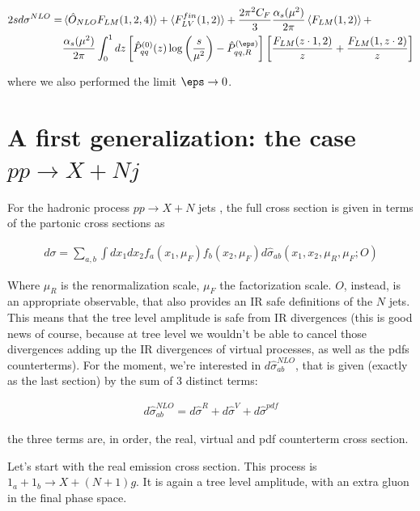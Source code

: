 \documentclass[11pt]{report}
\begin{document}
\begin{align}
    2sd\sigma^{NLO} = &\braket{\hat{O}_{NLO}F_{LM}(1, 2, 4)} + \braket{F_{LV}^{fin}(1, 2)} + \frac{2\pi^2C_F}{3}\frac{\alpha_s(\mu^2)}{2\pi}\braket{F_{LM}(1, 2)} + \notag \\ 
    & \frac{\alpha_s(\mu^2)}{2\pi}\int_0^1 dz \left[\hat{P}^{(0)}_{qq}(z)\log\left( \frac{s}{\mu^2} \right) - \hat{P}^{(\eps)}_{qq, R}\right] \left[\frac{F_{LM}(z\cdot1, 2)}{z} + \frac{F_{LM}(1, z\cdot 2)}{z}  \right]
\end{align}

where we also performed the limit \(\eps \to 0\). 

\section{A first generalization: the case \(pp \to X + Nj\)}

For the hadronic process \(pp \to X + N\) jets , the full cross section is given in terms of the partonic cross sections as 

\begin{align}
    \label{eq:qqXNgcrosssec}
    d\sigma = \sum_{a, b} \int dx_1 dx_2 f_a(x_1, \mu_F)f_b(x_2, \mu_F)d\hat{\sigma}_{ab}(x_1, x_2, \mu_R, \mu_F; O)
\end{align}

Where \(\mu_{R}\) is the renormalization scale, \(\mu_F\) the factorization scale. \(O\), instead, is an appropriate observable, that also provides an IR safe definitions of the \(N\) jets. This means that the tree level amplitude is safe from IR divergences (this is good news of course, because at tree level we wouldn't be able to cancel those divergences adding up the IR divergences of virtual processes, as well as the pdfs counterterms). For the moment, we're interested in \(d\hat{\sigma}_{ab}^{NLO}\), that is given (exactly as the last section) by the sum of 3 distinct terms: 

\begin{align}
    d\hat{\sigma}^{NLO}_{ab} = d\hat{\sigma}^{R} + d\hat{\sigma}^{V} + d\hat{\sigma}^{pdf}
\end{align}

the three terms are, in order, the real, virtual and pdf counterterm cross section. 

Let's start with the real emission cross section. This process is \(1_a + 1_b \to X + (N+1)g\). It is again a tree level amplitude, with an extra gluon in the final phase space. 
\end{document}
